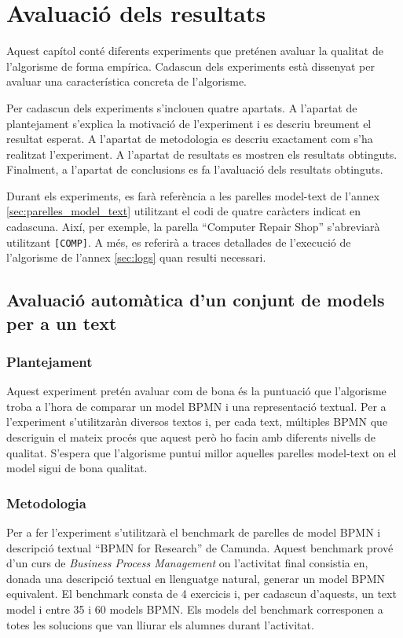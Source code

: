 \chapter{Avaluació dels resultats}
\label{cha:experiments}

Aquest capítol conté diferents experiments que preténen avaluar la qualitat de l'algorisme de forma empírica. Cadascun dels experiments està dissenyat per avaluar una característica concreta de l'algorisme.

Per cadascun dels experiments s'inclouen quatre apartats. A l'apartat de plantejament s'explica la motivació de l'experiment i es descriu breument el resultat esperat. A l'apartat de metodologia es descriu exactament com s'ha realitzat l'experiment. A l'apartat de resultats es mostren els resultats obtinguts. Finalment, a l'apartat de conclusions es fa l'avaluació dels resultats obtinguts.

Durant els experiments, es farà referència a les parelles model-text de l'annex \ref{sec:parelles_model_text} utilitzant el codi de quatre caràcters indicat en cadascuna. Així, per exemple, la parella ``Computer Repair Shop'' s'abreviarà utilitzant \texttt{[COMP]}. A més, es referirà a traces detallades de l'execució de l'algorisme de l'annex \ref{sec:logs} quan resulti necessari.

\section{Avaluació automàtica d'un conjunt de models per a un text}
\label{sec:experiments-avaluacio}
\subsection{Plantejament}

Aquest experiment pretén avaluar com de bona és la puntuació que l'algorisme troba a l'hora de comparar un model BPMN i una representació textual. Per a l'experiment s'utilitzaràn diversos textos i, per cada text, múltiples BPMN que descriguin el mateix procés que aquest però ho facin amb diferents nivells de qualitat. S'espera que l'algorisme puntui millor aquelles parelles model-text on el model sigui de bona qualitat. 

\subsection{Metodologia}

Per a fer l'experiment s'utilitzarà el benchmark de parelles de model BPMN i descripció textual ``BPMN for Research'' de Camunda\cite{camunda_models}. Aquest benchmark prové d'un curs de \emph{Business Process Management} on l'activitat final consistia en, donada una descripció textual en llenguatge natural, generar un model BPMN equivalent. El benchmark consta de 4 exercicis i, per cadascun d'aquests, un text model i entre 35 i 60 models BPMN. Els models del benchmark corresponen a totes les solucions que van lliurar els alumnes durant l'activitat. 

